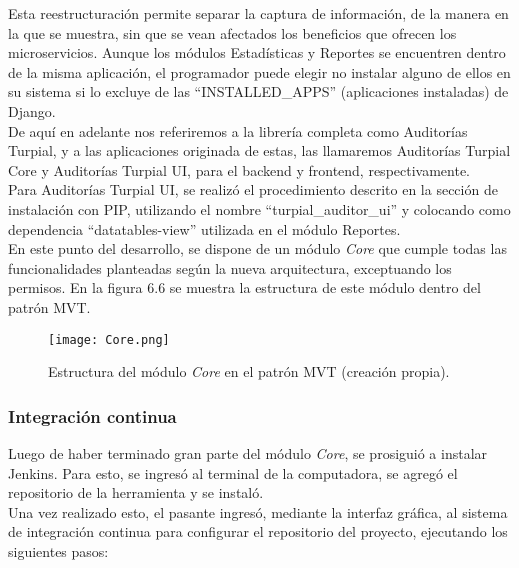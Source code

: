 Esta reestructuración permite separar la captura de información, de la manera en la que se muestra, sin que se vean afectados los beneficios que ofrecen los microservicios. Aunque los módulos Estadísticas y Reportes se encuentren dentro de la misma aplicación, el programador puede elegir no instalar alguno de ellos en su sistema si lo excluye de las “INSTALLED\_APPS” (aplicaciones instaladas) de Django.\\

De aquí en adelante nos referiremos a la librería completa como Auditorías Turpial, y a las aplicaciones originada de estas, las llamaremos Auditorías Turpial Core y Auditorías Turpial UI, para el backend y frontend, respectivamente.\\

Para Auditorías Turpial UI, se realizó el procedimiento descrito en la sección de instalación con PIP, utilizando el nombre “turpial_auditor_ui” y colocando como dependencia “datatables-view” utilizada en el módulo Reportes.\\

En este punto del desarrollo, se dispone de un módulo \textit{Core} que cumple todas las funcionalidades planteadas según la nueva arquitectura, exceptuando los permisos. En la figura 6.6 se muestra la estructura de este módulo dentro del patrón MVT.

\begin{figure}[h]
\centering
\texttt{[image: Core.png]}
\caption{Estructura del módulo \textit{Core} en el patrón MVT (creación propia).}
\label{fig:figura6.6}
\end{figure}

\subsubsection{Integración continua}

Luego de haber terminado gran parte del módulo \textit{Core}, se prosiguió a instalar Jenkins. Para esto, se ingresó al terminal de la computadora, se agregó el repositorio de la herramienta y se instaló.\\

Una vez realizado esto, el pasante ingresó, mediante la interfaz gráfica, al sistema de integración continua para configurar el repositorio del proyecto, ejecutando los siguientes pasos:

